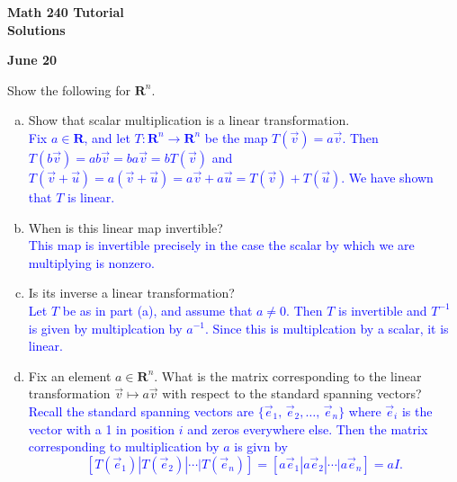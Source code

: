 \documentclass[a4paper,11pt]{article}
\newcommand{\R}{\mathbf{R}}
\newcommand{\BB}[1]{\textcolor{blue}{#1}}
\begin{document}
\begin{center}
  {\Large\bfseries Math 240 Tutorial \\ Solutions}
\end{center}
\begin{center}
  {\bfseries June 20}
\end{center}

 Show the following for $\R^n$.
\begin{enumerate}[(a)]
\item Show that scalar multiplication is a linear transformation. \\

  \BB{Fix $a \in \R$, and let $T:\R^n \rightarrow \R^n$ be the map $T(\vec
    v)=a\vec v$. Then $T(b\vec v)=ab\vec v=ba\vec v=bT(\vec v)$ and $T(\vec
    v+\vec u)=a(\vec v+\vec u)=a\vec v+a\vec u=T(\vec v)+T(\vec u)$. We have
    shown that $T$ is linear. \\}

\item When is this linear map invertible? \\

  \BB{This map is invertible precisely in the case the scalar by which we are
    multiplying is nonzero. \\}
  
\item Is its inverse a linear transformation? \\

  \BB{Let $T$ be as in part (a), and assume that $a \neq 0$. Then $T$ is
    invertible and $T^{-1}$ is given by multiplcation by $a^{-1}$. Since this
    is multiplcation by a scalar, it is linear. \\}
  
\item Fix an element $a \in \R^n$. What is the matrix corresponding to the
linear transformation $\vec v \mapsto a\vec v$ with respect to the standard
spanning vectors? \\

\BB{Recall the standard spanning vectors are $\{\vec e_1,\,\vec e_2,\dots,\,\vec
  e_n\}$ where $\vec e_i$ is the vector with a 1 in position $i$ and zeros
  everywhere else. Then the matrix corresponding to multiplication by $a$ is
  givn by
  \[
    [T(\vec e_1) | T(\vec e_2) | \cdots | T(\vec e_n)]=
    [a\vec e_1 | a\vec e_2 | \cdots | a\vec e_n] = aI.
  \]
}
\end{enumerate}
\end{document}
